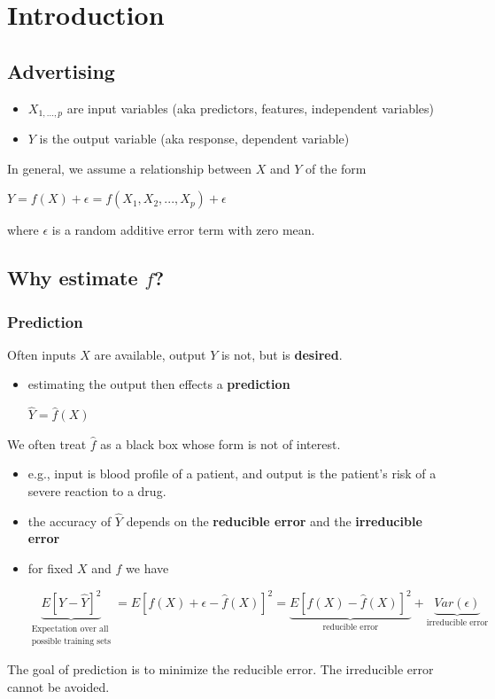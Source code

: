 

\chapter{Introduction}

	\section{Advertising}
		\begin{itemize}
			\item $X_{1,...,p}$ are input variables (aka predictors, features, independent variables)
			\item $Y$ is the output variable (aka response, dependent variable)
		\end{itemize}
		In general, we assume a relationship between $X$ and $Y$ of the form
		\begin{center}
			$Y = f(X) + \epsilon = f(X_1,X_2,...,X_p) + \epsilon$
		\end{center}
		where $\epsilon$ is a random additive error term with zero mean.

	\section{Why estimate $f$?}
		\subsection{Prediction}
			Often inputs $X$ are available, output $Y$ is not, but is \textbf{desired}.
			\begin{itemize}
				\item estimating the output then effects a \textbf{prediction}
					\begin{center}
						$\hat{Y} = \hat{f}(X)$
					\end{center}
			\end{itemize}
			We often treat $\hat{f}$ as a black box whose form is not of interest.
			\begin{itemize}
				\item e.g., input is blood profile of a patient, and output is the patient's risk of a severe reaction to a drug.
				\item the accuracy of $\hat{Y}$ depends on the \textbf{reducible error} and the \textbf{irreducible error}
				\item for fixed $X$ and $f$ we have
					\begin{center}
						$\underbrace{E[Y-\hat{Y}]^2}_{\substack{\text{Expectation over all} \\ \text{possible training sets}}} 
						= E[f(X) + \epsilon - \hat{f}(X)]^2
						= \underbrace{E[f(X)-\hat{f}(X)]^2}_{\text{reducible error}} + \underbrace{Var(\epsilon)}_{\text{irreducible error}}$
					\end{center}
			\end{itemize}
			The goal of prediction is to minimize the reducible error. The irreducible error cannot be avoided.
		
